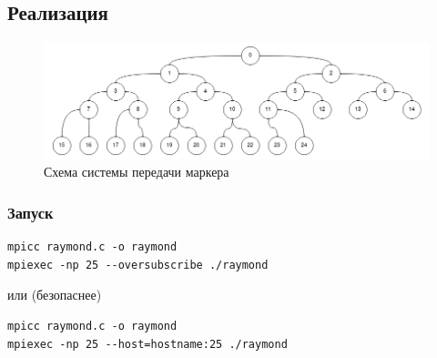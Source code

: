 \documentclass[a4paper,12pt,titlepage,final]{article}
\begin{document}
\subsection{Реализация}
\begin{figure}[h!]
  \includegraphics[width=1\linewidth]{marker.png}
  \caption{Схема системы передачи маркера}
  \label{fig:marker}
\end{figure}
\subsubsection{Запуск}
\begin{verbatim}
mpicc raymond.c -o raymond
mpiexec -np 25 --oversubscribe ./raymond
\end{verbatim}
или (безопаснее)
\begin{verbatim}
mpicc raymond.c -o raymond
mpiexec -np 25 --host=hostname:25 ./raymond
\end{verbatim}
\end{document}
